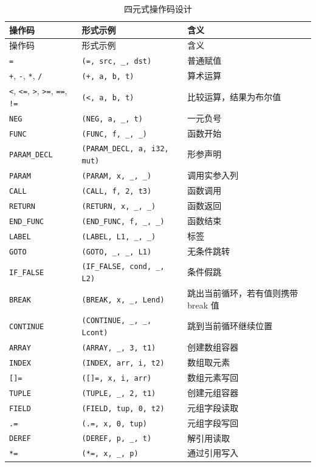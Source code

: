 \documentclass[UTF8,a4paper,12pt]{ctexart}
\newcommand{\pkg}[1]{\texttt{#1}}
\newcommand{\op}[1]{\texttt{#1}}
\begin{document}
\begin{longtable}{P{2.3cm}P{4.8cm}P{6.0cm}}
    \caption{四元式操作码设计}\label{tab:quad-opcodes}\\
    \toprule
    操作码 & 形式示例 & 含义 \\
    \midrule
    \endfirsthead
    \toprule
    操作码 & 形式示例 & 含义 \\
    \midrule
    \endhead
    \op{=} & \pkg{(=, src, \_, dst)} & 普通赋值 \\
    \op{+}, \op{-}, \op{*}, \op{/} & \pkg{(+, a, b, t)} & 算术运算 \\
    \op{<}, \op{<=}, \op{>}, \op{>=}, \op{==}, \op{!=} & \pkg{(<, a, b, t)} & 比较运算，结果为布尔值 \\
    \op{NEG} & \pkg{(NEG, a, \_, t)} & 一元负号 \\
    \op{FUNC} & \pkg{(FUNC, f, \_, \_)} & 函数开始 \\
    \op{PARAM\_DECL} & \pkg{(PARAM\_DECL, a, i32, mut)} & 形参声明 \\
    \op{PARAM} & \pkg{(PARAM, x, \_, \_)} & 调用实参入列 \\
    \op{CALL} & \pkg{(CALL, f, 2, t3)} & 函数调用 \\
    \op{RETURN} & \pkg{(RETURN, x, \_, \_)} & 函数返回 \\
    \op{END\_FUNC} & \pkg{(END\_FUNC, f, \_, \_)} & 函数结束 \\
    \op{LABEL} & \pkg{(LABEL, L1, \_, \_)} & 标签 \\
    \op{GOTO} & \pkg{(GOTO, \_, \_, L1)} & 无条件跳转 \\
    \op{IF\_FALSE} & \pkg{(IF\_FALSE, cond, \_, L2)} & 条件假跳 \\
    \op{BREAK} & \pkg{(BREAK, x, \_, Lend)} & 跳出当前循环，若有值则携带 break 值 \\
    \op{CONTINUE} & \pkg{(CONTINUE, \_, \_, Lcont)} & 跳到当前循环继续位置 \\
    \op{ARRAY} & \pkg{(ARRAY, \_, 3, t1)} & 创建数组容器 \\
    \op{INDEX} & \pkg{(INDEX, arr, i, t2)} & 数组取元素 \\
    \op{[]=} & \pkg{([]=, x, i, arr)} & 数组元素写回 \\
    \op{TUPLE} & \pkg{(TUPLE, \_, 2, t1)} & 创建元组容器 \\
    \op{FIELD} & \pkg{(FIELD, tup, 0, t2)} & 元组字段读取 \\
    \op{.=} & \pkg{(.=, x, 0, tup)} & 元组字段写回 \\
    \op{DEREF} & \pkg{(DEREF, p, \_, t)} & 解引用读取 \\
    \op{*=} & \pkg{(*=, x, \_, p)} & 通过引用写入 \\
    \bottomrule
\end{longtable}
\end{document}
